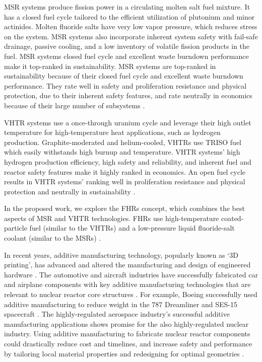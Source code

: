 \gls{MSR} systems produce fission power in a circulating molten salt fuel mixture. 
It has a closed fuel cycle tailored to the efficient utilization of plutonium 
and minor actinides. 
Molten fluoride salts have very low vapor pressure, which reduces stress on the 
system. 
MSR systems also incorporate inherent system safety with fail-safe drainage, 
passive cooling, and a low inventory of volatile fission products in the fuel. 
\gls{MSR} systems closed fuel cycle and excellent waste burndown performance 
make it top-ranked in sustainability. 
MSR systems are top-ranked in sustainability because of their closed fuel cycle 
and excellent waste burndown performance. 
They rate well in safety and proliferation resistance and physical protection, 
due to their inherent safety features, and rate neutrally in economics because of
their large number of subsystems \cite{gif_technology_2002}.  

\gls{VHTR} systems use a once-through uranium cycle and leverage their 
high outlet temperature for high-temperature heat applications, such as hydrogen 
production. 
Graphite-moderated and helium-cooled, \glspl{VHTR} use \gls{TRISO} fuel
which easily withstands high burnup and temperature.  
\gls{VHTR} systems' high hydrogen production efficiency, high safety and 
reliability, and inherent fuel and reactor safety features make it highly 
ranked in economics. 
An open fuel cycle results in \gls{VHTR} systems' ranking well in proliferation 
resistance and physical protection and neutrally in sustainability 
\cite{gif_technology_2002}. 

In the proposed work, we explore the \glspl{FHR} concept, which 
combines the best aspects of \gls{MSR} and \gls{VHTR} technologies. 
\glspl{FHR} use high-temperature coated-particle fuel (similar to the \glspl{VHTR}) 
and a low-pressure liquid fluoride-salt coolant (similar to the \glspl{MSR})
\cite{forsberg_fluoride-salt-cooled_2012,facilitators_fluoride-salt-cooled_2013}.

In recent years, additive manufacturing technology, popularly known as `3D printing', 
has advanced and altered the manufacturing and design of engineered hardware
\cite{simpson_considerations_2019}. 
The automotive and aircraft industries have successfully fabricated car and 
airplane components with key additive manufacturing technologies that are 
relevant to nuclear reactor core structures \cite{murr_frontiers_2016}.  
For example, Boeing successfully used additive manufacturing to reduce weight 
in the 787 Dreamliner \cite{noauthor_printed_2017} and SES-15 spacecraft 
\cite{noauthor_boeing_nodate}. 
The highly-regulated aerospace industry's successful additive manufacturing 
applications shows promise for the also highly-regulated nuclear industry.  
Using additive manufacturing to fabricate nuclear reactor components could 
drastically reduce cost and timelines, and increase safety and performance by 
tailoring local material properties and redesigning for optimal geometries
\cite{simpson_considerations_2019}. 

